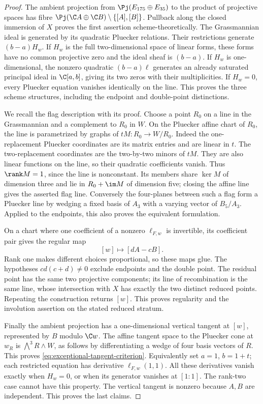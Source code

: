 \begin{proof}
The ambient projection from \(\Pj(E_{175}\oplus E_{35})\) to the
product of projective spaces has fibre
\(\Pj(\C A\oplus\C B)\setminus\{[A],[B]\}\).
Pullback along the closed immersion of \(X\) proves the first
assertion scheme-theoretically.  The Grassmannian ideal is generated
by its quadratic Pluecker relations.  Their restrictions generate
\((b-a)H_w\).  If \(H_w\) is the full two-dimensional space of
linear forms, these forms have no common projective zero and the
ideal sheaf is \((b-a)\).  If \(H_w\) is one-dimensional, the
nonzero quadratic \((b-a)\ell\) generates an already saturated
principal ideal in \(\C[a,b]\), giving its two zeros with their
multiplicities.  If \(H_w=0\), every Pluecker equation vanishes
identically on the line.  This proves the three scheme structures,
including the endpoint and double-point distinctions.

We recall the flag description with its proof.  Choose a point
\(R_0\) on a line in the Grassmannian and a complement to \(R_0\)
in \(W\).  On the Pluecker affine chart of \(R_0\), the line is
parametrized by graphs of \(tM:R_0\to W/R_0\).  Indeed the
one-replacement Pluecker coordinates are its matrix entries and are
linear in \(t\).  The two-replacement coordinates are the two-by-two
minors of \(tM\).  They are also linear functions on the line, so
their quadratic coefficients vanish.  Thus \(\rank M=1\), since
the line is nonconstant.  Its members share \(\ker M\) of dimension
three and lie in \(R_0+\im M\) of dimension five; closing the affine
line gives the asserted flag line.  Conversely the four-planes
between such a flag form a Pluecker line by wedging a fixed basis of
\(A_3\) with a varying vector of \(B_5/A_3\).  Applied to the
endpoints, this also proves the equivalent formulation.

On a chart where one coefficient of a nonzero \(\ell_{F,w}\) is
invertible, its coefficient pair gives the regular map
\[
 [w]\longmapsto[dA-cB].
\]
Rank one makes different choices proportional, so these maps glue.
The hypotheses \(cd(c+d)\ne0\) exclude endpoints and the double
point.  The residual point has the same two projective components;
its line of recombination is the same line, whose intersection with
\(X\) has exactly the two distinct reduced points.  Repeating the
construction returns \([w]\).  This proves regularity and the
involution assertion on the stated reduced stratum.

Finally the ambient projection has a one-dimensional vertical tangent
at \([w]\), represented by \(B\) modulo \(\C w\).  The affine
tangent space to the Pluecker cone at \(w_R\) is
\(\bigwedge^3R\wedge W\), as follows by differentiating a wedge
of four basis vectors of \(R\).  This proves
\eqref{eq:exceptional-tangent-criterion}.  Equivalently set \(a=1\),
\(b=1+t\); each restricted equation has derivative
\(\ell_{F,w}(1,1)\).  All these derivatives vanish exactly when
\(H_w=0\), or when its generator vanishes at \([1:1]\).
The rank-two case cannot have this property.  The vertical tangent
is nonzero because \(A,B\) are independent.  This proves the last
claims.
\end{proof}

